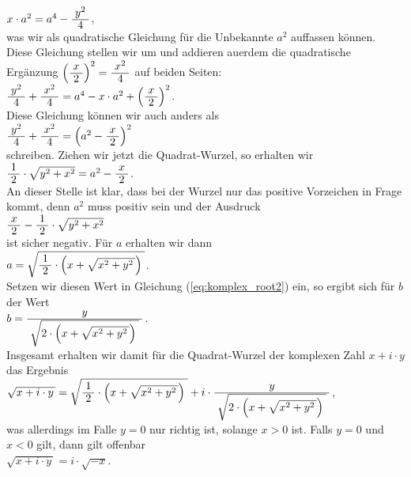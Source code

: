 \hspace*{1.3cm}
$x \cdot a^2 = a^4 - \bruch{y^2}{4}$,
\\[0.2cm] 
was wir als quadratische Gleichung f\"{u}r die  Unbekannte $a^2$ auffassen k\"{o}nnen.
 Diese Gleichung stellen wir um und addieren au\3erdem die quadratische Erg\"{a}nzung 
$\left(\bruch{x}{2}\right)^2 = \bruch{x^2}{4}$ auf 
beiden Seiten: 
\\[0.2cm]
\hspace*{1.3cm}
$\bruch{y^2}{4} + \bruch{x^2}{4} = a^4 - x \cdot a^2 + \left(\bruch{x}{2}\right)^2$.
\\[0.2cm]
Diese Gleichung k\"{o}nnen wir auch anders als
\\[0.2cm]
\hspace*{1.3cm}
$\bruch{y^2}{4} + \bruch{x^2}{4} = \left(a^2 - \bruch{x}{2}\right)^2$
\\[0.2cm]
schreiben.  Ziehen wir jetzt die Quadrat-Wurzel, so erhalten wir
\\[0.2cm]
\hspace*{1.3cm}
$\bruch{1}{2} \cdot \sqrt{y^2 + x^2} = a^2 - \bruch{x}{2}$.
\\[0.2cm]
An dieser Stelle ist klar, dass bei der Wurzel nur das positive Vorzeichen in Frage kommt, denn
$a^2$ muss positiv sein und der Ausdruck
\\[0.2cm]
\hspace*{1.3cm}
$\bruch{x}{2} - \bruch{1}{2} \cdot \sqrt{y^2 + x^2}$
\\[0.2cm]
ist sicher negativ.  F\"{u}r $a$ erhalten wir dann
\\[0.2cm]
\hspace*{1.3cm}
$a = \sqrt{\bruch{1}{2} \cdot \Bigl(x + \sqrt{x^2 + y^2\,}\Bigr)\;}$.
\\[0.2cm]
Setzen wir diesen Wert in Gleichung (\ref{eq:komplex_root2}) ein, so ergibt sich f\"{u}r $b$ der Wert
\\[0.2cm]
\hspace*{1.3cm}
$b = \bruch{y}{\sqrt{2\cdot \Bigl(x + \sqrt{x^2 + y^2\,}\Bigr)\;}}$.
\\[0.2cm]
Insgesamt erhalten wir damit f\"{u}r die Quadrat-Wurzel der komplexen Zahl $x + i \cdot y$ das Ergebnis
\\[0.2cm]
\hspace*{1.3cm}
$\sqrt{x + i \cdot y\,} = \sqrt{\bruch{1}{2} \cdot \Bigl(x + \sqrt{x^2 + y^2\,}\Bigr)\;}
 + i \cdot \bruch{y}{\sqrt{2\cdot \Bigl(x + \sqrt{x^2 + y^2\,}\Bigr)\;}}
$,
\\[0.2cm]
was allerdings im Falle $y = 0$ nur richtig ist, solange $x > 0$ ist.  Falls $y = 0$ und $x < 0$ gilt,
dann gilt offenbar
\\[0.2cm]
\hspace*{1.3cm}
$\sqrt{x + i \cdot y\,} = i \cdot \sqrt{-x}$.



